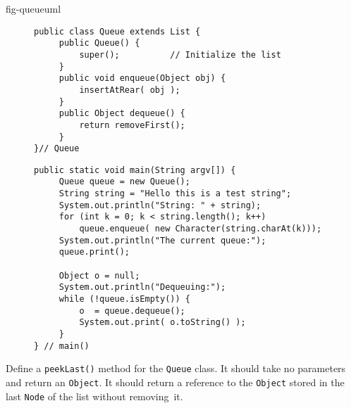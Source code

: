 {fig-queueuml}

\begin{figure}[h!]%
\jjjprogstart
\begin{jjjlisting}
\begin{lstlisting}
public class Queue extends List {
     public Queue() {
         super();          // Initialize the list
     }
     public void enqueue(Object obj) {
         insertAtRear( obj );
     }
     public Object dequeue() {
         return removeFirst();
     }
}// Queue
\end{lstlisting}
\end{jjjlisting}
\end{figure}%


\begin{figure}[h!]
\jjjprogstart
\begin{jjjlisting}
\begin{lstlisting}
public static void main(String argv[]) {
     Queue queue = new Queue();
     String string = "Hello this is a test string";
     System.out.println("String: " + string);
     for (int k = 0; k < string.length(); k++)
         queue.enqueue( new Character(string.charAt(k)));
     System.out.println("The current queue:");
     queue.print();

     Object o = null;
     System.out.println("Dequeuing:");
     while (!queue.isEmpty()) {
         o  = queue.dequeue();
         System.out.print( o.toString() );
     }
} // main()
\end{lstlisting}
\end{jjjlisting}
\end{figure}




\pagebreak
{}
\begin{SSTUDY}

\item  Define a {\tt peekLast()} method for 
the {\tt Queue} class.  It
should take no parameters and return an {\tt Object}. It should 
return a reference
to the {\tt Object} stored in the last {\tt Node} of the list without
removing~it.
\end{SSTUDY}

